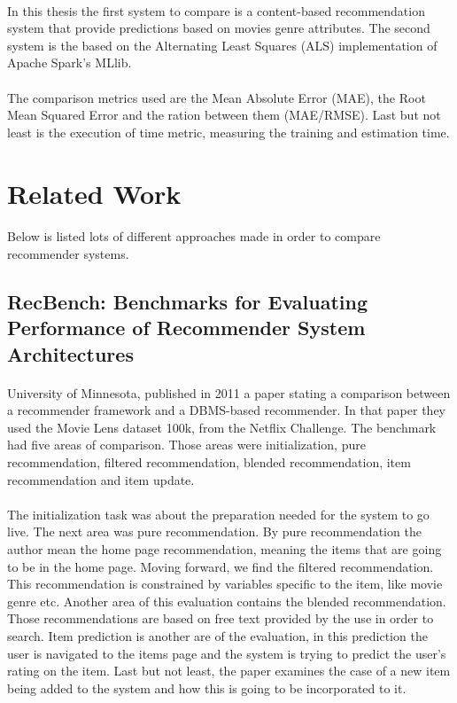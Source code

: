 \paragraph{} In this thesis the first system to compare is a content-based recommendation system that provide predictions based on movies genre attributes. The second system is the based on the Alternating Least Squares (ALS) implementation of Apache Spark's MLlib.

\paragraph{} The comparison metrics used are the Mean Absolute Error (MAE), the Root Mean Squared Error and the ration between them (MAE/RMSE). Last but not least is the execution of time metric, measuring the training and estimation time.

\section{Related Work}
\paragraph{} Below is listed lots of different approaches made in order to compare recommender systems.

\subsection{RecBench: Benchmarks for Evaluating Performance of Recommender System Architectures \cite{levandoski2011recbench}}
\paragraph{}University of Minnesota, published in 2011 a paper stating a comparison between a recommender framework and a DBMS-based recommender. In that paper they used the Movie Lens dataset 100k, from the Netflix Challenge. The benchmark had five areas of comparison. Those areas were initialization, pure recommendation, filtered recommendation, blended recommendation, item recommendation and item update.

\paragraph{}The initialization task was about the preparation needed for the system to go live. The next area was pure recommendation. By pure recommendation the author mean the home page recommendation, meaning the items that are going to be in the home page. Moving forward, we find the filtered recommendation. This recommendation is constrained by variables specific to the item, like movie genre etc. Another area of this evaluation contains the blended recommendation. Those recommendations are based on free text provided by the use in order to search. Item prediction is another are of the evaluation, in this prediction the user is navigated to the items page and the system is trying to predict the user's rating on the item. Last but not least, the paper examines the case of a new item being added to the system and how this is going to be incorporated to it.

